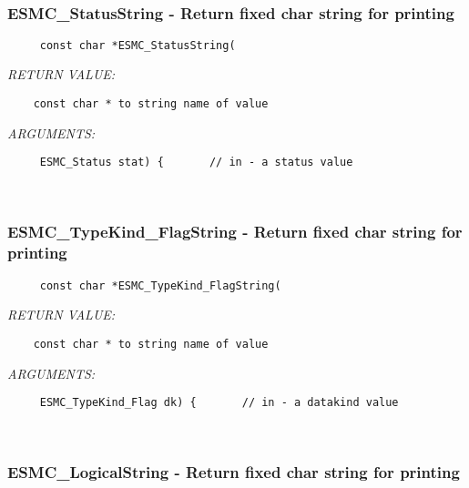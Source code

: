  
\mbox{}\hrulefill\
 
\subsubsection [ESMC\_StatusString] {ESMC\_StatusString - Return fixed char string for printing}


  
\begin{verbatim}     const char *ESMC_StatusString(\end{verbatim}{\em RETURN VALUE:}
\begin{verbatim}    const char * to string name of value\end{verbatim}{\em ARGUMENTS:}
\begin{verbatim}     ESMC_Status stat) {       // in - a status value\end{verbatim}
 
 
\mbox{}\hrulefill\
 
\subsubsection [ESMC\_TypeKind\_FlagString] {ESMC\_TypeKind\_FlagString - Return fixed char string for printing}


  
\begin{verbatim}     const char *ESMC_TypeKind_FlagString(\end{verbatim}{\em RETURN VALUE:}
\begin{verbatim}    const char * to string name of value\end{verbatim}{\em ARGUMENTS:}
\begin{verbatim}     ESMC_TypeKind_Flag dk) {       // in - a datakind value\end{verbatim}
 
 
\mbox{}\hrulefill\
 
\subsubsection [ESMC\_LogicalString] {ESMC\_LogicalString - Return fixed char string for printing}


